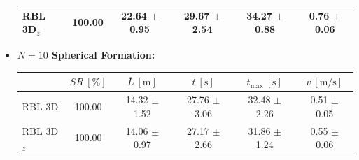 \begin{itemize}
\begin{table}[H]
\begin{tabular}{|l|c|c|c|c|c|}
                RBL \ac{3D}\(_z\)                & 100.00          & 22.64 $\pm$ 0.95                  & 29.67 $\pm$ 2.54                  & 34.27 $\pm$ 0.88                               & 0.76 $\pm$ 0.06                         \\ \hline
                \end{tabular}
            \end{table}
        \item \textbf{$N = 10$ Spherical Formation:}
            \begin{table}[H]
                \centering
                \renewcommand{\arraystretch}{1.2}
                \begin{tabular}{|l|c|c|c|c|c|}
                \hline
                                            & \( SR \ [\%] \) & \( \overline{L} \ [\mathrm{m}] \) & \( \overline{t} \ [\mathrm{s}] \) & \( \overline{t}_{\text{max}} \ [\mathrm{s}] \) & \( \overline{v} \ [\mathrm{m/s}] \)     \\ \hline
                RBL \ac{3D}                      & 100.00          & 14.32 $\pm$ 1.52                  & 27.76 $\pm$ 3.06                  & 32.48 $\pm$ 2.26                               & 0.51 $\pm$ 0.05                         \\ \hline
                RBL \ac{3D}\(_z\)                & 100.00          & 14.06 $\pm$ 0.97                  & 27.17 $\pm$ 2.66                  & 31.86 $\pm$ 1.24                               & 0.55 $\pm$ 0.06                         \\ \hline
                \end{tabular}
            \end{table}
    \end{itemize}


